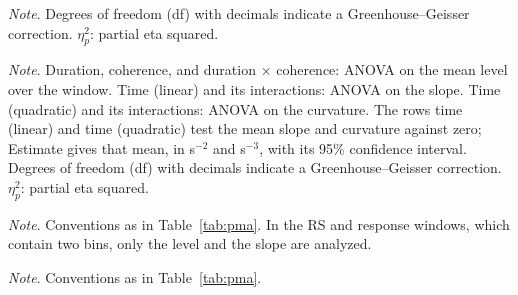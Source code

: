 \documentclass[a4paper,11pt]{article}
\theoremstyle{definition}
\newcommand{\1}{\mathbbm{1}}
\begin{document}
\bigskip

\label{tab:behav}

\begin{center}\small

\end{center}
\emph{Note}. Degrees of freedom (df) with decimals indicate a Greenhouse--Geisser correction. $\eta_{p}^{2}$: partial eta squared.

\bigskip

\label{tab:pma}

\begin{center}\small
\resizebox{\linewidth}{!}{%

}
\end{center}
\emph{Note}. Duration, coherence, and duration $\times$ coherence: ANOVA on the mean level over the window. Time (linear) and its interactions: ANOVA on the slope. Time (quadratic) and its interactions: ANOVA on the curvature. The rows time (linear) and time (quadratic) test the mean slope and curvature against zero; Estimate gives that mean, in s$^{-2}$ and s$^{-3}$, with its 95\% confidence interval. Degrees of freedom (df) with decimals indicate a Greenhouse--Geisser correction. $\eta_{p}^{2}$: partial eta squared.

\bigskip

\label{tab:lrp}

\begin{center}\small
\resizebox{\linewidth}{!}{%

}
\end{center}
\emph{Note}. Conventions as in Table~\ref{tab:pma}. In the RS and response windows, which contain two bins, only the level and the slope are analyzed.

\bigskip

\label{tab:mbl}

\begin{center}\small
\resizebox{\linewidth}{!}{%

}
\end{center}
\emph{Note}. Conventions as in Table~\ref{tab:pma}.
\end{document}
